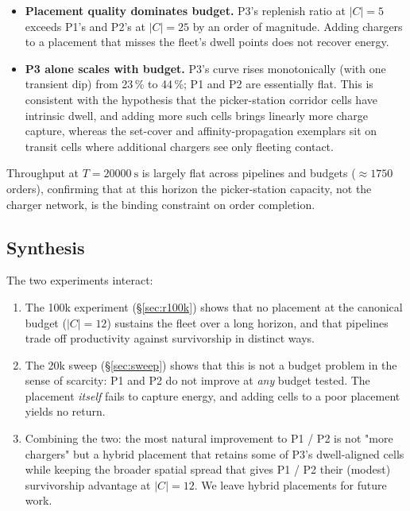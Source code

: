 \begin{itemize}
  \item \textbf{Placement quality dominates budget.} P3's replenish
  ratio at $|C| = 5$ exceeds P1's and P2's at $|C| = 25$ by an
  order of magnitude. Adding chargers to a placement that misses the
  fleet's dwell points does not recover energy.
  \item \textbf{P3 alone scales with budget.} P3's curve rises
  monotonically (with one transient dip) from 23\,\% to 44\,\%; P1
  and P2 are essentially flat. This is consistent with the
  hypothesis that the picker-station corridor cells have intrinsic
  dwell, and adding more such cells brings linearly more charge
  capture, whereas the set-cover and affinity-propagation
  exemplars sit on transit cells where additional chargers see
  only fleeting contact.
\end{itemize}

Throughput at $T = \SI{20000}{\second}$ is largely flat across
pipelines and budgets ($\approx 1750$ orders), confirming that at
this horizon the picker-station capacity, not the charger network,
is the binding constraint on order completion.

\subsection{Synthesis}
\label{sec:synthesis}

The two experiments interact:

\begin{enumerate}
  \item The 100k experiment (\S\ref{sec:r100k}) shows that no
  placement at the canonical budget ($|C| = 12$) sustains the
  fleet over a long horizon, and that pipelines trade off
  productivity against survivorship in distinct ways.
  \item The 20k sweep (\S\ref{sec:sweep}) shows that this is not
  a budget problem in the sense of scarcity: P1 and P2 do not
  improve at \emph{any} budget tested. The placement \emph{itself}
  fails to capture energy, and adding cells to a poor placement
  yields no return.
  \item Combining the two: the most natural improvement to P1 / P2
  is not "more chargers" but a hybrid placement that retains some
  of P3's dwell-aligned cells while keeping the broader spatial
  spread that gives P1 / P2 their (modest) survivorship advantage
  at $|C| = 12$. We leave hybrid placements for future work.
\end{enumerate}

